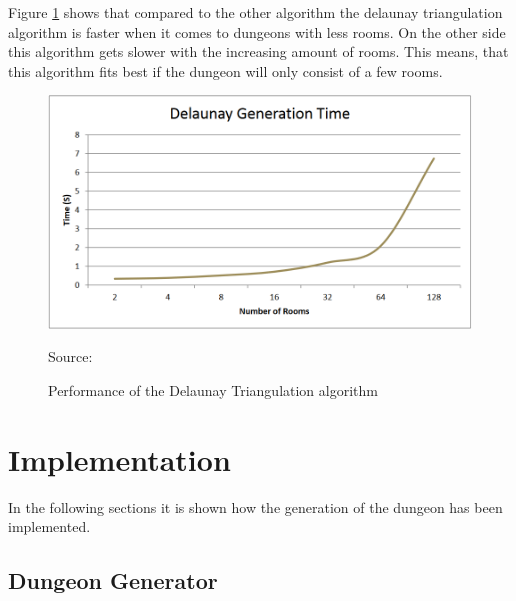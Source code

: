 \documentclass[a4paper,11pt,oneside]{scrreprt}
\begin{document}
\newpage
Figure \ref{fig:delaunay_performance} shows that compared to the other algorithm the delaunay triangulation algorithm is faster when it comes to dungeons with less rooms. On the other side this algorithm gets slower with the increasing amount of rooms. This means, that this algorithm fits best if the dungeon will only consist of a few rooms.
\begin{figure}[htb]
	\centering
	\includegraphics[scale=0.5]{images/delaunay_performance.png} 
	\caption{Performance of the Delaunay Triangulation algorithm}
	Source: \cite[][]{williams_investigation_nodate}
	\label{fig:delaunay_performance}
\end{figure}

\chapter{Implementation}
In the following sections it is shown how the generation of the dungeon has been implemented.
\section{Dungeon Generator}
\end{document}
